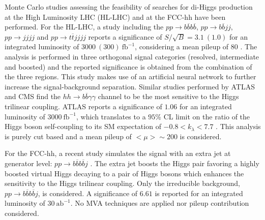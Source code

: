 Monte Carlo studies assessing the feasibility of searches for di-Higgs production at the High Luminosity LHC (HL-LHC) and at the FCC-hh have been performed. For the HL-LHC, a study including the $pp\rightarrow b\overline{b}b\overline{b}$, $pp\rightarrow b\overline{b}jj$, $pp\rightarrow jjjj$ and $pp\rightarrow t\overline{t}jjjj$ reports a significance of $S/\sqrt{B}=3.1~(1.0)$ for an integrated luminosity of $3000~(300)~\text{fb}^{-1}$, considering a mean pileup of $80$ \cite{hhFeasibility}. The analysis is performed in three orthogonal signal categories (resolved, intermediate and boosted) and the reported significance is obtained from the combination of the three regions. This study makes use of an artificial neural network to further increase the signal-background separation. Similar studies performed by ATLAS and CMS find the $hh\rightarrow b\overline{b}\gamma\gamma$ channel to be the most sensitive to the Higgs trilinear coupling. ATLAS reports a significance of $1.06$ for an integrated luminosity of $3000~\text{fb}^{-1}$, which translates to a $95\%$ CL limit on the ratio of the Higgs boson self-coupling to its SM expectation of $-0.8<k_{\lambda}<7.7$ \cite{ATLAShh2bbAA_HL}. This analysis is purely cut based and a mean pileup of $<\mu>\sim 200$ is considered. 

For the FCC-hh, a recent study simulates the signal with an extra jet at generator level: $pp\rightarrow b\overline{b}b\overline{b}j$ \cite{hh+jet_100TeV}. The extra jet boosts the Higgs pair favoring a highly boosted virtual Higgs decaying to a pair of Higgs bosons which enhances the sensitivity to the Higgs trilinear coupling. Only the irreducible background, $pp\rightarrow b\overline{b}b\overline{b}j$, is considered. A significance of $6.61$ is reported for an integrated luminosity of $30~\text{ab}^{-1}$. No MVA techniques are applied nor pileup contribution considered.

